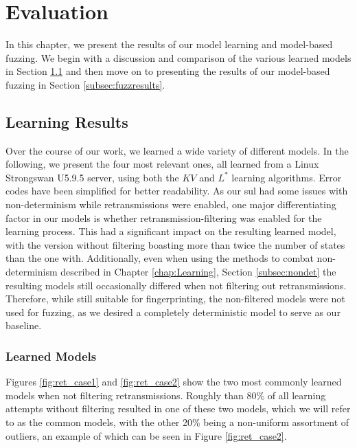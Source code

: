 %
%
% 
% 
% 

\chapter{Evaluation} \label{chap:Evaluation}

In this chapter, we present the results of our model learning and model-based fuzzing. We begin with a discussion and comparison of the various learned models in Section \ref{sec:learnresults} and then move on to presenting the results of our model-based fuzzing in Section \ref{subsec:fuzzresults}.

\section{Learning Results} \label{sec:learnresults}
Over the course of our work, we learned a wide variety of different models. In the following, we present the four most relevant ones, all learned from a Linux Strongswan U5.9.5 server, using both the $KV$ and $L^*$ learning algorithms. Error codes have been simplified for better readability. As our \ac{sul} had some issues with non-determinism while retransmissions were enabled, one major differentiating factor in our models is whether retransmission-filtering was enabled for the learning process. This had a significant impact on the resulting learned model, with the version without filtering boasting more than twice the number of states than the one with. Additionally, even when using the methods to combat non-determinism described in Chapter \ref{chap:Learning}, Section \ref{subsec:nondet} the resulting models still occasionally differed when not filtering out retransmissions. Therefore, while still suitable for fingerprinting, the non-filtered models were not used for fuzzing, as we desired a completely deterministic model to serve as our baseline.

\subsection{Learned Models} \label{subsec:models}
Figures \ref{fig:ret_case1} and \ref{fig:ret_case2} show the two most commonly learned models when not filtering retransmissions. Roughly than 80\% of all learning attempts without filtering resulted in one of these two models, which we will refer to as the common models, with the other 20\% being a non-uniform assortment of outliers, an example of which can be seen in Figure \ref{fig:ret_case2}. 

